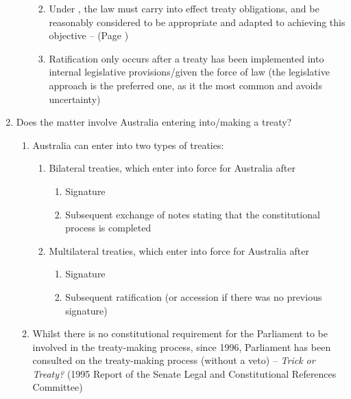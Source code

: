 \begin{enumerate}
\begin{enumerate}
\begin{enumerate}
\begin{enumerate}
            \end{enumerate}
            \item Under , the law must carry into effect treaty obligations, and be reasonably considered to be appropriate and adapted to achieving this objective --  (Page \pageref{case:Commonwealth v Tasmania})
            \item Ratification only occurs after a treaty has been implemented into internal legislative provisions/given the force of law (the legislative approach is the preferred one, as it the most common and avoids uncertainty)
        \end{enumerate}
    \end{enumerate}
    \item Does the matter involve Australia entering into/making a treaty?
    \begin{enumerate}
        \item Australia can enter into two types of treaties:
        \begin{enumerate}
            \item Bilateral treaties, which enter into force for Australia after
            \begin{enumerate}
                \item Signature
                \item Subsequent exchange of notes stating that the constitutional process is completed
            \end{enumerate}
            \item Multilateral treaties, which enter into force for Australia after
            \begin{enumerate}
                \item Signature
                \item Subsequent ratification (or accession if there was no previous signature)
            \end{enumerate}
        \end{enumerate}
        \item \label{item:trick or treaty} Whilst there is no constitutional requirement for the Parliament to be involved in the treaty-making process, since 1996, Parliament has been consulted on the treaty-making process (without a veto) -- \textit{Trick or Treaty?} (1995 Report of the Senate Legal and Constitutional References Committee)
        \begin{enumerate}

\end{enumerate}
\end{enumerate}
\end{enumerate}
